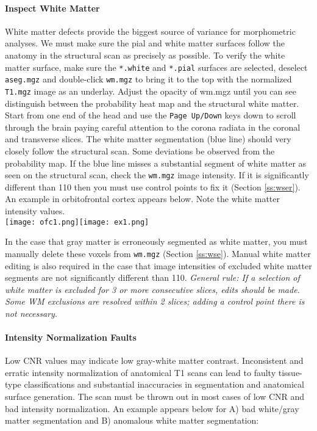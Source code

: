 \documentclass[paper=a4, fontsize=11pt]{scrartcl} %
\numberwithin{equation}{section} %
\numberwithin{figure}{section} %
\numberwithin{table}{section} %
\begin{document}
\paragraph{Inspect White Matter} White matter defects provide the biggest source of variance for morphometric analyses.  We must make sure the pial and white matter surfaces follow the anatomy in the structural scan as precisely as possible. To verify the white matter surface, make sure the \texttt{*.white} and \texttt{*.pial} surfaces are selected, deselect \texttt{aseg.mgz} and double-click \texttt{wm.mgz} to bring it to the top with the normalized \texttt{T1.mgz} image as an underlay.  Adjust the opacity of wm.mgz until you can see distinguish between the probability heat map and the structural white matter.  Start from one end of the head and use the \texttt{Page Up/Down} keys down to scroll through the brain paying careful attention to the corona radiata in the coronal and transverse slices.  The white matter segmentation (blue line) should very closely follow the structural scan.  Some deviations be observed from the probability map.  If the blue line misses a substantial segment of white matter as seen on the structural scan, check the \texttt{wm.mgz} image intensity.  If it is significantly different than 110 then you must use control points to fix it (Section \ref{ss:wser}).  An example in orbitofrontal cortex appears below.  Note the white matter intensity values. \\ 

\texttt{[image: ofc1.png]}\texttt{[image: ex1.png]}

In the case that gray matter is erroneously segmented as white matter, you must manually delete these voxels from \texttt{wm.mgz} (Section \ref{ss:wse}).  Manual white matter editing is also required in the case that image intensities of excluded white matter segments are not significantly different than 110. \textit{General rule: If a selection of white matter is excluded for 3 or more consecutive slices, edits should be made.  Some WM exclusions are resolved within 2 slices; adding a control point there is not necessary.}

\paragraph{Intensity Normalization Faults}  Low CNR values may indicate low gray-white matter contrast.  Inconsistent and erratic intensity normalization of anatomical T1 scans can lead to faulty tissue-type classifications and substantial inaccuracies in segmentation and anatomical surface generation.  The scan must be thrown out in most cases of low CNR and bad intensity normalization.  An example appears below for A) bad white/gray matter segmentation and B) anomalous white matter segmentation:
\end{document}
